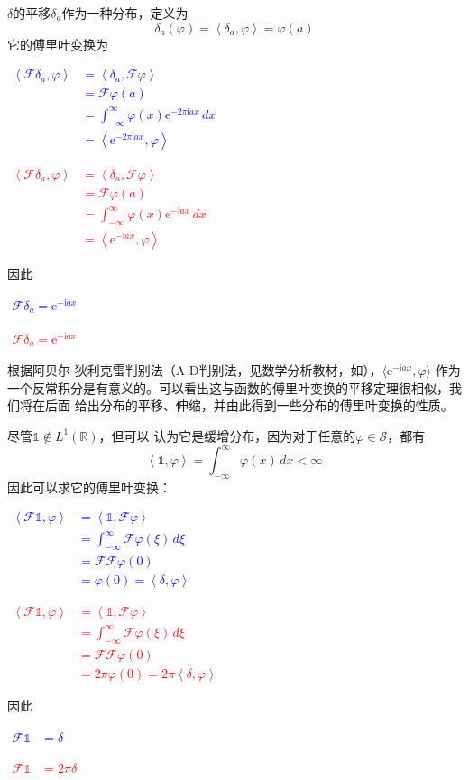 \documentclass{ctexbook}
\newcommand{\lr}[2]{%
    \begin{center}
    \begin{minipage}[t]{0.45\textwidth}
        \centering
        \allowdisplaybreaks
        \textcolor{blue}{%
            \begin{varwidth}{\linewidth}
            $\begin{aligned}
            #1
            \end{aligned}$
            \end{varwidth}
        }
    \end{minipage}
    \hfill
    \begin{minipage}[t]{0.45\textwidth}
        \centering
        \allowdisplaybreaks
        \textcolor{red}{%
            \begin{varwidth}{\linewidth}
            $\begin{aligned}
            #2
            \end{aligned}$
            \end{varwidth}
        }
    \end{minipage}
\end{center}
}
\begin{document}
\begin{example}
    $\delta$的平移$\delta_a$作为一种分布，定义为
\begin{equation}
    \delta_a(\varphi)=\left\langle \delta_a,\varphi\right\rangle=\varphi(a)
\end{equation}
它的傅里叶变换为
\lr{
\left\langle\mathcal{F}\delta_a,\varphi\right\rangle&=\left\langle \delta_a,\mathcal{F}\varphi\right\rangle\\
&=\mathcal{F}\varphi(a)\\
&=\int_{-\infty}^{\infty}\varphi(x)\mathrm{e}^{-2\pi \mathrm{i}ax}\,dx\\
&=\left\langle \mathrm{e}^{-2\pi \mathrm{i}ax},\varphi\right\rangle
}{
\left\langle\mathcal{F}\delta_a,\varphi\right\rangle&=\left\langle \delta_a,\mathcal{F}\varphi\right\rangle\\
&=\mathcal{F}\varphi(a)\\
&=\int_{-\infty}^{\infty}\varphi(x)\mathrm{e}^{-\mathrm{i} a x}\,dx\\
&=\left\langle \mathrm{e}^{-\mathrm{i} a x},\varphi\right\rangle
}
因此
\lr{
    \mathcal{F}\delta_a =\mathrm{e}^{-\mathrm{i} a x}
}{
    \mathcal{F}\delta_a =\mathrm{e}^{-\mathrm{i} a x}
}
根据阿贝尔-狄利克雷判别法（A-D判别法，见数学分析教材，如\cite{xinjiang}），$\langle \mathrm{e}^{-\mathrm{i} a x},\varphi\rangle$
作为一个反常积分是有意义的。可以看出这与函数的傅里叶变换的平移定理很相似，我们将在后面
给出分布的平移、伸缩，并由此得到一些分布的傅里叶变换的性质。
\end{example}

\begin{example}
尽管$\mathds{1}\notin L^1(\mathbb{R})$，但可以
认为它是缓增分布，因为对于任意的$\varphi\in\mathcal{S} $，都有
\[\left\langle \mathds{1},\varphi\right\rangle=\int_{-\infty}^{\infty}\varphi(x)\,dx<\infty\]
因此可以求它的傅里叶变换：
\lr{
    \left\langle \mathcal{F} \mathds{1},\varphi\right\rangle&=\left\langle \mathds{1},\mathcal{F} \varphi\right\rangle\\
    &=\int_{-\infty}^{\infty}\mathcal{F} \varphi(\xi)\,d\xi\\
    &=\mathcal{F} \mathcal{F} \varphi(0)\\
    &=\varphi(0)=\left\langle \delta,\varphi\right\rangle
}{
    \left\langle \mathcal{F} \mathds{1},\varphi\right\rangle&=\left\langle \mathds{1},\mathcal{F} \varphi\right\rangle\\
    &=\int_{-\infty}^{\infty}\mathcal{F} \varphi(\xi)\,d\xi\\
    &=\mathcal{F} \mathcal{F} \varphi(0)\\
    &=2\pi\varphi(0)=2\pi\left\langle \delta,\varphi\right\rangle
}
因此\lr{
    \mathcal{F} \mathds{1}&=\delta
}{
    \mathcal{F} \mathds{1}&=2\pi\delta
}
\end{example}
\end{document}

